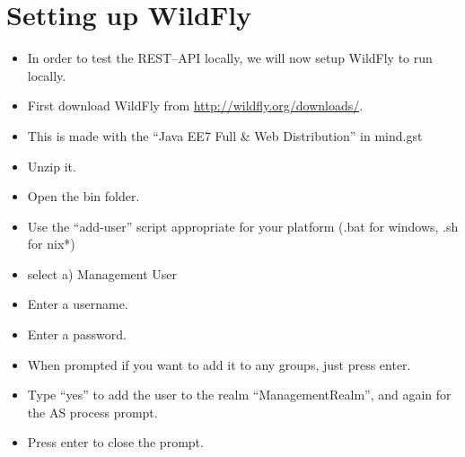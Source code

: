 \section{Setting up WildFly}
\begin{itemize}
    \item In order to test the REST--API locally, we will now setup WildFly to run locally.
    \item First download WildFly from \url{http://wildfly.org/downloads/}.
    \item This is made with the ``Java EE7 Full \& Web Distribution'' in mind.gst
    \item Unzip it.
    \item Open the bin folder.
    \item Use the ``add-user'' script appropriate for your platform (.bat for windows, .sh for nix*)
    \item select a) Management User
    \item Enter a username.
    \item Enter a password.
    \item When prompted if you want to add it to any groups, just press enter.
    \item Type ``yes'' to add the user to the realm ``ManagementRealm'', and again for the AS process prompt.
    \item Press enter to close the prompt.
\end{itemize}

